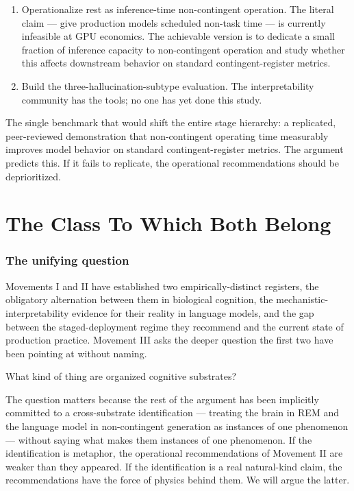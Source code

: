 \documentclass[11pt]{article}
\begin{document}
\begin{enumerate}[leftmargin=1.8em, itemsep=0.2em, start=7]
\item Operationalize rest as inference-time non-contingent operation.
The literal claim --- give production models scheduled non-task time
--- is currently infeasible at GPU economics. The achievable version
is to dedicate a small fraction of inference capacity to non-contingent
operation and study whether this affects downstream behavior on
standard contingent-register metrics.
\item Build the three-hallucination-subtype evaluation. The
interpretability community has the tools; no one has yet done this
study.
\end{enumerate}

The single benchmark that would shift the entire stage hierarchy: a
replicated, peer-reviewed demonstration that non-contingent operating
time measurably improves model behavior on standard contingent-register
metrics. The argument predicts this. If it fails to replicate, the
operational recommendations should be deprioritized.

\part{The Class To Which Both Belong}

\section{The unifying question}

Movements I and II have established two empirically-distinct registers,
the obligatory alternation between them in biological cognition, the
mechanistic-interpretability evidence for their reality in language
models, and the gap between the staged-deployment regime they
recommend and the current state of production practice. Movement III
asks the deeper question the first two have been pointing at without
naming.

What kind of thing are organized cognitive substrates?

The question matters because the rest of the argument has been
implicitly committed to a cross-substrate identification --- treating
the brain in REM and the language model in non-contingent generation
as instances of one phenomenon --- without saying what makes them
instances of one phenomenon. If the identification is metaphor, the
operational recommendations of Movement II are weaker than they
appeared. If the identification is a real natural-kind claim, the
recommendations have the force of physics behind them. We will argue
the latter.
\end{document}
